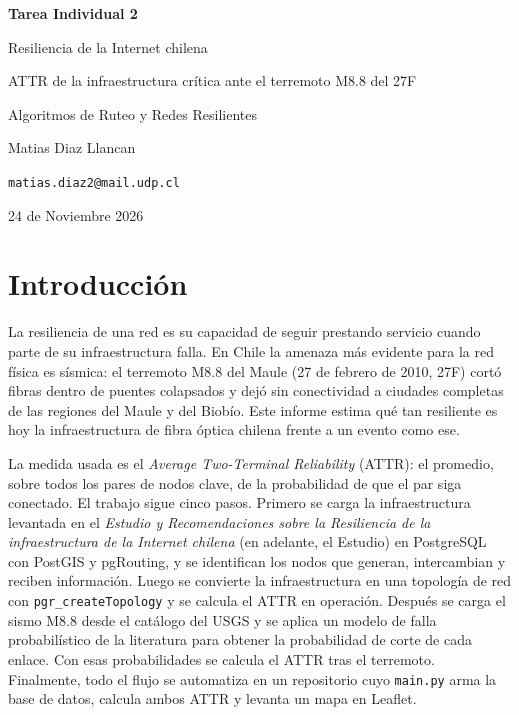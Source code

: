 \documentclass[11pt,a4paper]{article}
\newcommand{\cod}[1]{\texttt{#1}}
\begin{document}
\begin{titlepage}
\centering
\vspace*{3cm}
{\LARGE\bfseries Tarea Individual 2\par}
\vspace{1cm}
{\Large Resiliencia de la Internet chilena\par}
{\large ATTR de la infraestructura crítica ante el terremoto M8.8 del 27F\par}
\vspace{2cm}
{\large Algoritmos de Ruteo y Redes Resilientes\par}
\vfill
{\large Matias Diaz Llancan\par}
{\texttt{matias.diaz2@mail.udp.cl}\par}
\vspace{1cm}
{\large 24 de Noviembre 2026\par}
\vspace*{2cm}
\end{titlepage}

\tableofcontents
\newpage

\section{Introducción}
La resiliencia de una red es su capacidad de seguir prestando servicio cuando parte de su
infraestructura falla. En Chile la amenaza más evidente para la red física es sísmica: el terremoto
M8.8 del Maule (27 de febrero de 2010, 27F) cortó fibras dentro de puentes colapsados y dejó sin
conectividad a ciudades completas de las regiones del Maule y del Biobío. Este informe estima qué tan
resiliente es hoy la infraestructura de fibra óptica chilena frente a un evento como ese.

La medida usada es el \emph{Average Two-Terminal Reliability} (ATTR): el promedio, sobre todos los
pares de nodos clave, de la probabilidad de que el par siga conectado. El trabajo sigue cinco pasos.
Primero se carga la infraestructura levantada en el \emph{Estudio y Recomendaciones sobre la
Resiliencia de la infraestructura de la Internet chilena} (en adelante, el Estudio) en PostgreSQL con
PostGIS y pgRouting, y se identifican los nodos que generan, intercambian y reciben información. Luego
se convierte la infraestructura en una topología de red con \cod{pgr\_createTopology} y se calcula el
ATTR en operación. Después se carga el sismo M8.8 desde el catálogo del USGS y se aplica un modelo de
falla probabilístico de la literatura para obtener la probabilidad de corte de cada enlace. Con esas
probabilidades se calcula el ATTR tras el terremoto. Finalmente, todo el flujo se automatiza en un
repositorio cuyo \cod{main.py} arma la base de datos, calcula ambos ATTR y levanta un mapa en Leaflet.
\end{document}
